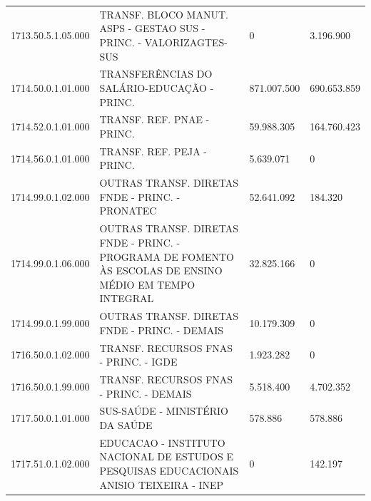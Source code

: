 \documentclass{article}
\begin{document}
\begin{longtable}[c]{m{2cm}|m{11cm}|m{2cm}m{2cm}}
\multicolumn{1}{C{2cm}|}{1713.50.5.1.05.000} & \multicolumn{1}{L{11cm}|}{TRANSF. BLOCO MANUT. ASPS - GESTAO SUS - PRINC. - VALORIZAGTES-SUS} & \multicolumn{1}{R{2cm}|}{            0} & \multicolumn{1}{R{2cm}}{3.196.900} \\
\multicolumn{1}{C{2cm}|}{1714.50.0.1.01.000} & \multicolumn{1}{L{11cm}|}{TRANSFERÊNCIAS DO SALÁRIO-EDUCAÇÃO - PRINC.} & \multicolumn{1}{R{2cm}|}{871.007.500} & \multicolumn{1}{R{2cm}}{690.653.859} \\
\multicolumn{1}{C{2cm}|}{1714.52.0.1.01.000} & \multicolumn{1}{L{11cm}|}{TRANSF. REF. PNAE - PRINC.} & \multicolumn{1}{R{2cm}|}{59.988.305} & \multicolumn{1}{R{2cm}}{164.760.423} \\
\multicolumn{1}{C{2cm}|}{1714.56.0.1.01.000} & \multicolumn{1}{L{11cm}|}{TRANSF. REF. PEJA - PRINC.} & \multicolumn{1}{R{2cm}|}{5.639.071} & \multicolumn{1}{R{2cm}}{            0} \\
\multicolumn{1}{C{2cm}|}{1714.99.0.1.02.000} & \multicolumn{1}{L{11cm}|}{OUTRAS TRANSF. DIRETAS FNDE - PRINC. - PRONATEC} & \multicolumn{1}{R{2cm}|}{52.641.092} & \multicolumn{1}{R{2cm}}{184.320} \\
\multicolumn{1}{C{2cm}|}{1714.99.0.1.06.000} & \multicolumn{1}{L{11cm}|}{OUTRAS TRANSF. DIRETAS FNDE - PRINC. - PROGRAMA DE FOMENTO ÀS ESCOLAS DE ENSINO MÉDIO EM TEMPO INTEGRAL} & \multicolumn{1}{R{2cm}|}{32.825.166} & \multicolumn{1}{R{2cm}}{            0} \\
\multicolumn{1}{C{2cm}|}{1714.99.0.1.99.000} & \multicolumn{1}{L{11cm}|}{OUTRAS TRANSF. DIRETAS FNDE - PRINC. - DEMAIS} & \multicolumn{1}{R{2cm}|}{10.179.309} & \multicolumn{1}{R{2cm}}{            0} \\
\multicolumn{1}{C{2cm}|}{1716.50.0.1.02.000} & \multicolumn{1}{L{11cm}|}{TRANSF. RECURSOS FNAS - PRINC. - IGDE} & \multicolumn{1}{R{2cm}|}{1.923.282} & \multicolumn{1}{R{2cm}}{            0} \\
\multicolumn{1}{C{2cm}|}{1716.50.0.1.99.000} & \multicolumn{1}{L{11cm}|}{TRANSF. RECURSOS FNAS - PRINC. - DEMAIS} & \multicolumn{1}{R{2cm}|}{5.518.400} & \multicolumn{1}{R{2cm}}{4.702.352} \\
\multicolumn{1}{C{2cm}|}{1717.50.0.1.01.000} & \multicolumn{1}{L{11cm}|}{SUS-SAÚDE - MINISTÉRIO DA SAÚDE} & \multicolumn{1}{R{2cm}|}{578.886} & \multicolumn{1}{R{2cm}}{578.886} \\
\multicolumn{1}{C{2cm}|}{1717.51.0.1.02.000} & \multicolumn{1}{L{11cm}|}{EDUCACAO - INSTITUTO NACIONAL DE ESTUDOS E PESQUISAS EDUCACIONAIS ANISIO TEIXEIRA - INEP} & \multicolumn{1}{R{2cm}|}{            0} & \multicolumn{1}{R{2cm}}{142.197} \\

\end{longtable}
\end{document}
